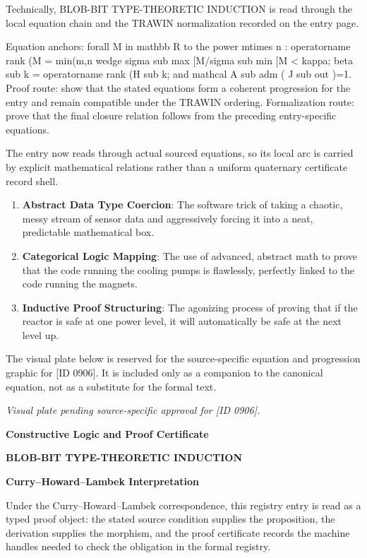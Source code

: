 Technically, BLOB-BIT TYPE-THEORETIC INDUCTION is read through the local equation chain and the TRAWIN normalization recorded on the entry page.

Equation anchors: forall M in mathbb R to the power mtimes n : operatorname rank (M = min(m,n wedge sigma sub max [M/sigma sub min [M < kappa; beta sub k = operatorname rank (H sub k; and mathcal A sub adm ( J sub out )=1. Proof route: show that the stated equations form a coherent progression for the entry and remain compatible under the TRAWIN ordering. Formalization route: prove that the final closure relation follows from the preceding entry-specific equations.

The entry now reads through actual sourced equations, so its local arc is carried by explicit mathematical relations rather than a uniform quaternary certificate record shell.
\endgroup

\begin{enumerate}[leftmargin=1.6em,itemsep=6pt,topsep=4pt]
\item \textbf{Abstract Data Type Coercion}: The software trick of taking a chaotic, messy stream of sensor data and aggressively forcing it into a neat, predictable mathematical box.
\item \textbf{Categorical Logic Mapping}: The use of advanced, abstract math to prove that the code running the cooling pumps is flawlessly, perfectly linked to the code running the magnets.
\item \textbf{Inductive Proof Structuring}: The agonizing process of proving that if the reactor is safe at one power level, it will automatically be safe at the next level up.
\end{enumerate}

\begingroup\footnotesize\sloppy
The visual plate below is reserved for the source-specific equation and progression graphic for [ID 0906]. It is included only as a companion to the canonical equation, not as a substitute for the formal text.
\par\endgroup
\begingroup\footnotesize\itshape
Visual plate pending source-specific approval for [ID 0906].
\par\endgroup

\clearpage
\begingroup\tzpsupportsetup
\noindent\textbf{\fontsize{10.8pt}{12.8pt}\selectfont [ID 0906] Constructive Logic and Proof Certificate}\par
\noindent\textbf{\fontsize{10pt}{12pt}\selectfont BLOB-BIT TYPE-THEORETIC INDUCTION}\par
\vspace{0.45em}
\begingroup
\footnotesize
\setlength{\parskip}{0.22em}
\setlength{\parindent}{0pt}
\noindent\textbf{Curry--Howard--Lambek Interpretation}\par
Under the Curry--Howard--Lambek correspondence, this registry entry is read as a typed proof
object: the stated source condition supplies the proposition, the derivation supplies the
morphism, and the proof certificate records the machine handles needed to check the obligation
in the formal registry.

